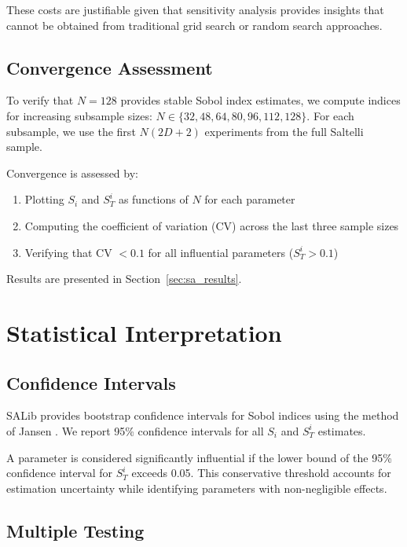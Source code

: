 These costs are justifiable given that sensitivity analysis provides insights that cannot be obtained from traditional grid search or random search approaches.

\subsection{Convergence Assessment}
\label{sec:sa_convergence}

To verify that $N = 128$ provides stable Sobol index estimates, we compute indices for increasing subsample sizes: $N \in \{32, 48, 64, 80, 96, 112, 128\}$. For each subsample, we use the first $N(2D + 2)$ experiments from the full Saltelli sample.

Convergence is assessed by:
\begin{enumerate}
    \item Plotting $S_i$ and $S_T^i$ as functions of $N$ for each parameter
    \item Computing the coefficient of variation (CV) across the last three sample sizes
    \item Verifying that CV $< 0.1$ for all influential parameters ($S_T^i > 0.1$)
\end{enumerate}

Results are presented in Section~\ref{sec:sa_results}.

\section{Statistical Interpretation}

\subsection{Confidence Intervals}

SALib provides bootstrap confidence intervals for Sobol indices using the method of Jansen \citep{jansen1999analysis}. We report 95\% confidence intervals for all $S_i$ and $S_T^i$ estimates.

A parameter is considered significantly influential if the lower bound of the 95\% confidence interval for $S_T^i$ exceeds 0.05. This conservative threshold accounts for estimation uncertainty while identifying parameters with non-negligible effects.

\subsection{Multiple Testing}

